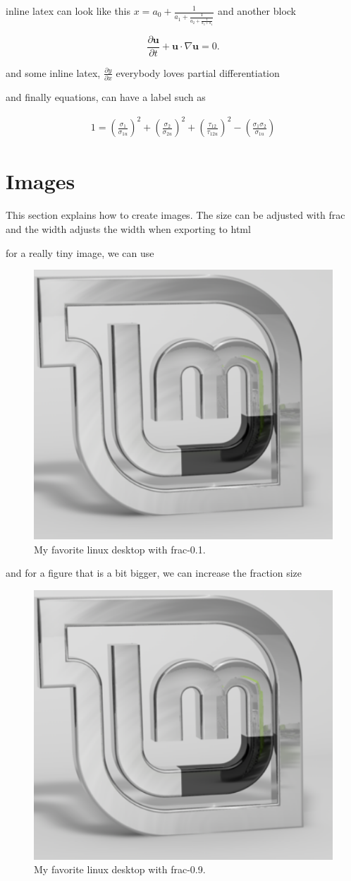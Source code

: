 \documentclass[%
twocolumn,
twoside,                 %
final,                   %
10pt]{article}
\begin{document}
inline latex can look like this 
$x = a_0 + \frac{1}{\displaystyle a_1 + \frac{1}{\displaystyle a_2 + \frac{1}{\displaystyle a_3 + a_4}}}$
and another block

\[ \frac{\partial\pmb{u}}{\partial t} + \pmb{u}\cdot\nabla\pmb{u} = 0.\]

and some inline latex,  $\frac{\partial y}{\partial x}$ everybody loves partial differentiation

and finally equations, can have a label such as 

\begin{align}
1 =  \left(\frac{\sigma_{1}}{\sigma_{1u}}\right)^{2} + \left(\frac{\sigma_{2}}{\sigma_{2u}}\right)^{2}  +  \left(\frac{\tau_{12}}{\tau_{12u}}\right)^{2}  - \left(\frac{\sigma_{1} \sigma_{2}} {\sigma_{1u} }\right) \label{eqn:tsaihill}  
\end{align}


\section{Images}
\label{sec:img}

This section explains how to create images. The size can be adjusted with frac and the width adjusts the width when exporting to html

for a really tiny image, we can use

\begin{figure}
  \centerline{\includegraphics[width=0.1\linewidth]{fig/mint.png}}
  \caption{
  My favorite linux desktop with frac-0.1.  \label{fig:myfig1}
  }
\end{figure}


and for a figure that is a bit bigger, we can increase the fraction size

\begin{figure}
  \centerline{\includegraphics[width=0.3\linewidth]{fig/mint.png}}
  \caption{
  My favorite linux desktop with frac-0.9.    \label{fig:myfig2}
  }
\end{figure}
\end{document}
